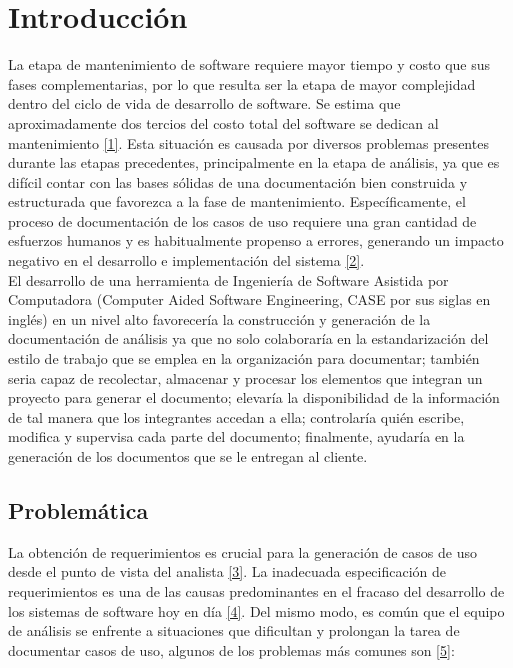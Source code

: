 \chapter{Introducción}
La etapa de mantenimiento de software requiere mayor tiempo y costo que sus fases complementarias, por lo que resulta ser la etapa de mayor complejidad dentro del ciclo de vida de desarrollo de software. Se estima que aproximadamente dos tercios del costo total del software se dedican al mantenimiento \hyperlink{b01}{[1]}. Esta situación es causada por diversos problemas presentes durante las etapas precedentes, principalmente en la etapa de análisis, ya que es difícil contar con las bases sólidas de una documentación bien construida y estructurada que favorezca a la fase de mantenimiento. Específicamente, el proceso de documentación de los casos de uso requiere una gran cantidad de esfuerzos humanos y es habitualmente propenso a errores, generando un impacto negativo en el desarrollo e implementación del sistema \hyperlink{b02}{[2]}. \\

El desarrollo de una herramienta de Ingeniería de Software Asistida por Computadora (Computer Aided Software Engineering, CASE por sus siglas en inglés) en un nivel alto  favorecería la construcción y generación de la documentación de análisis ya que no solo colaboraría en la estandarización del estilo de trabajo que se emplea en la organización para documentar; también seria capaz de recolectar, almacenar y procesar los elementos que integran un proyecto para generar el documento; elevaría la disponibilidad de la información de tal manera que los integrantes accedan a ella; controlaría quién escribe, modifica y supervisa cada parte del documento; finalmente, ayudaría en la generación de los documentos que se le entregan al cliente.

\newpage
\section{Problemática}

La obtención de requerimientos es crucial para la generación de casos de uso desde el punto de vista del analista \hyperlink{b03}{[3]}. La inadecuada especificación de requerimientos es una de las causas predominantes en el fracaso del desarrollo de los sistemas de software hoy en día \hyperlink{b04}{[4]}. Del mismo modo, es común que el equipo de análisis se enfrente a situaciones que dificultan y prolongan la tarea de documentar casos de uso, algunos de los problemas más comunes son \hyperlink{b05}{[5]}: 

